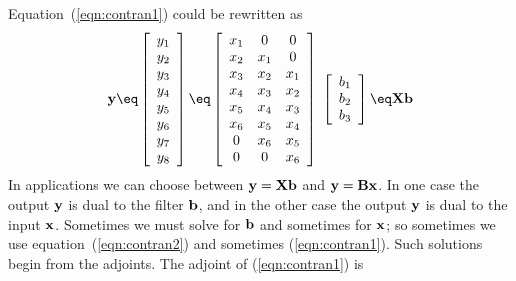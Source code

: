 \par
Equation~(\ref{eqn:contran1}) could be rewritten as
\begin{equation}
\bold y \eq
\left[ 
\begin{array}{c}
  y_1 \\ 
  y_2 \\ 
  y_3 \\ 
  y_4 \\ 
  y_5 \\ 
  y_6 \\ 
  y_7 \\ 
  y_8
  \end{array} \right] 
\eq
\left[ 
\begin{array}{ccc}
  x_1 & 0   & 0    \\
  x_2 & x_1 & 0    \\
  x_3 & x_2 & x_1  \\
  x_4 & x_3 & x_2  \\
  x_5 & x_4 & x_3  \\
  x_6 & x_5 & x_4  \\
  0   & x_6 & x_5  \\
  0   & 0   & x_6
  \end{array} \right] 
\; \left[ 
\begin{array}{c}
  b_1 \\ 
  b_2 \\ 
  b_3 \end{array} \right]
  \eq \bold X \bold b
\label{eqn:contran2}
\end{equation}
In applications we can choose between
$\bold y = \bold X \bold b$
and
$\bold y = \bold B \bold x$.
In one case
the output $\bold y$
is dual to the filter $\bold b$,
and in the other case
the output $\bold y$
is dual to the input $\bold x$.
Sometimes we must solve
for $\bold b$ and sometimes for $\bold x$;
so sometimes we use equation~(\ref{eqn:contran2}) and 
sometimes (\ref{eqn:contran1}).
Such solutions begin from the adjoints.
The adjoint of (\ref{eqn:contran1}) is
